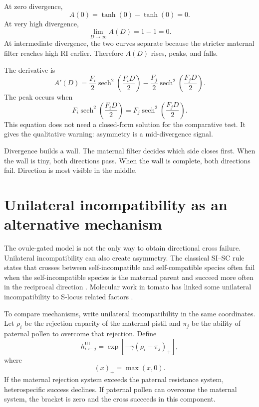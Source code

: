 \documentclass[12pt]{article}
\newcommand{\sech}{\operatorname{sech}}
\begin{document}
At zero divergence,
\begin{equation}
A(0)=\tanh(0)-\tanh(0)=0.
\end{equation}
At very high divergence,
\begin{equation}
\lim_{D\to\infty}A(D)=1-1=0.
\end{equation}
At intermediate divergence, the two curves separate because the stricter maternal filter reaches high RI earlier. Therefore $A(D)$ rises, peaks, and falls.

The derivative is
\begin{equation}
A'(D)=\frac{F_i}{2}\sech^2\left(\frac{F_iD}{2}\right)
-
\frac{F_j}{2}\sech^2\left(\frac{F_jD}{2}\right).
\end{equation}
The peak occurs when
\begin{equation}
F_i\sech^2\left(\frac{F_iD}{2}\right)=
F_j\sech^2\left(\frac{F_jD}{2}\right).
\end{equation}
This equation does not need a closed-form solution for the comparative test. It gives the qualitative warning: asymmetry is a mid-divergence signal.

\begin{metaphorbox}
Divergence builds a wall. The maternal filter decides which side closes first. When the wall is tiny, both directions pass. When the wall is complete, both directions fail. Direction is most visible in the middle.
\end{metaphorbox}

\section{Unilateral incompatibility as an alternative mechanism}

The ovule-gated model is not the only way to obtain directional cross failure. Unilateral incompatibility can also create asymmetry. The classical SI--SC rule states that crosses between self-incompatible and self-compatible species often fail when the self-incompatible species is the maternal parent and succeed more often in the reciprocal direction \citep{LewisCrowe1958,WangFilatov2023}. Molecular work in tomato has linked some unilateral incompatibility to S-locus related factors \citep{LiChetelat2015}.

To compare mechanisms, write unilateral incompatibility in the same coordinates. Let $\rho_i$ be the rejection capacity of the maternal pistil and $\pi_j$ be the ability of paternal pollen to overcome that rejection. Define
\begin{equation}
h^{\mathrm{UI}}_{i\leftarrow j}=\exp\left[-\gamma(\rho_i-\pi_j)_+\right],
\label{eq:hUI}
\end{equation}
where
\begin{equation}
(x)_+=\max(x,0).
\end{equation}
If the maternal rejection system exceeds the paternal resistance system, heterospecific success declines. If paternal pollen can overcome the maternal system, the bracket is zero and the cross succeeds in this component.
\end{document}
